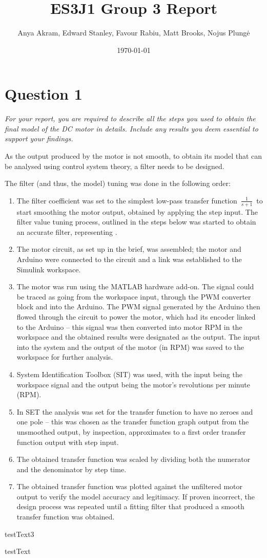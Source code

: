 \documentclass[11pt, onecolumn]{article}
\title{ES3J1 Group 3 Report}
\author{Anya Akram, Edward Stanley, Favour Rabiu, Matt Brooks, Nojus Plungė}
\date{\today}
\begin{document}
\maketitle

\section*{Question 1}
\par \textit{For your report, you are required to describe all the steps you used to obtain the final model of the DC motor in details. Include any results you deem essential to support your findings.}
\noindent\makebox[\linewidth]{\rule{\textwidth}{0.4pt}}
\par As the output produced by the motor is not smooth, to obtain its model that can be analysed using control system theory, a filter needs to be designed.
\par The filter (and thus, the model) tuning was done in the following order:
\begin{enumerate}
    \item The filter coefficient was set to the simplest low-pass transfer function $\frac{1}{s+1}$ to start smoothing the motor output, obtained by applying the step input. The filter value tuning process, outlined in the steps below was started to obtain an accurate filter, representing .
    \item The motor circuit, as set up in the brief, was assembled; the motor and Arduino were connected to the circuit and a link was established to the Simulink workspace.
    \item The motor was run using the MATLAB hardware add-on. The signal could be traced as going from the workspace input, through the PWM converter block and into the Arduino. The PWM signal generated by the Arduino then flowed through the circuit to power the motor, which had its encoder linked to the Arduino – this signal was then converted into motor RPM in the workspace and the obtained results were designated as the output. The input into the system and the output of the motor (in RPM) was saved to the workspace for further analysis.
    \item System Identification Toolbox (SIT) was used, with the input being the workspace signal and the output being the motor's revolutions per minute (RPM).
    \item In SET the analysis was set for the transfer function to have no zeroes and one pole – this was chosen as the transfer function graph output from the unsmoothed output, by inspection, approximates to a first order transfer function output with step input.
    \item The obtained transfer function was scaled by dividing both the numerator and the denominator by step time.
    \item The obtained transfer function was plotted against the unfiltered motor output to verify the model accuracy and legitimacy. If proven incorrect, the design process was repeated until a fitting filter that produced a smooth transfer function was obtained.
\end{enumerate}
\par testText3
\par testText
\end{document}
